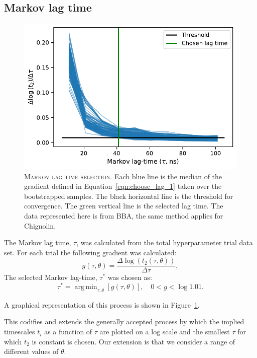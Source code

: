 \documentclass[journal=jacsat,manuscript=article]{achemso}
\DeclareMathOperator*{\argmin}{arg\,min}
\begin{document}
\subsection{Markov lag time}
\begin{figure}
    \centering
    \includegraphics{figures/timescale_selection.pdf}
    \caption{\textsc{Markov lag time selection}. Each blue line is the median of the gradient defined in Equation~\ref{eqn:choose_lag_1} taken over the bootstrapped samples. The black horizontal line is the threshold for convergence.  The green vertical line is the selected lag time. The data represented here is from BBA, the same method applies for Chignolin.}
    \label{fig:lag_selection}
\end{figure}

The Markov lag time, $\tau$, was calculated from the total hyperparameter trial data set. For each trial the following gradient was calculated:
\begin{equation}
    g(\tau, \theta) = \frac{\Delta \log{\left(t_{2}(\tau, \theta)\right)}}{\Delta \tau}, \label{eqn:choose_lag_1}
\end{equation}
The selected Markov lag-time, $\tau^{*}$ was chosen as:
\begin{equation}
    \tau^{*}  = \argmin_{\tau, \theta}\left[g(\tau, \theta)\right], \quad 0 < g < \log{1.01}. \label{eqn:choose_lag_2}
\end{equation}

A graphical representation of this process is shown in Figure~\ref{fig:lag_selection}. 

This codifies and extends the generally accepted process by which the implied timescales $t_{i}$ as a function of $\tau$ are plotted on a log scale and the smallest $\tau$ for which $t_{2}$ is constant is chosen. Our extension is that we consider a range of different values of $\theta$. 
\end{document}
